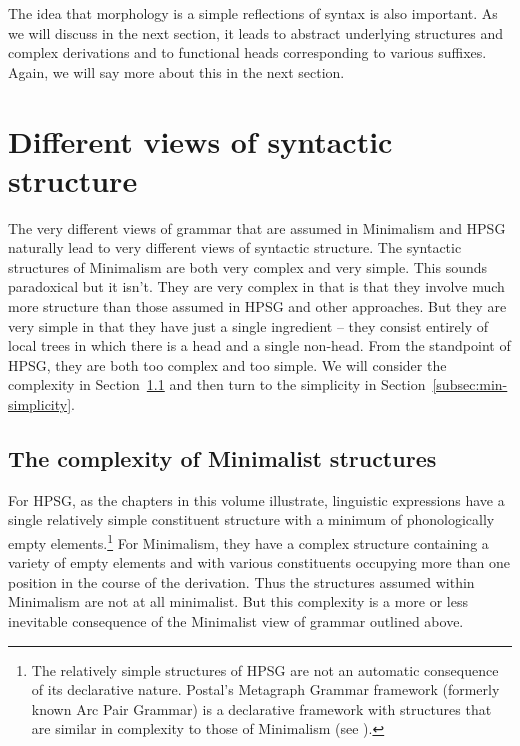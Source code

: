 \documentclass[output=paper]{langsci/langscibook}
\begin{document}
The idea that morphology is a simple reflections of syntax is also important. As we will discuss in the next section, it leads to abstract underlying structures and complex derivations and to functional heads corresponding to various suffixes. Again, we will say more about this in the next section. 
	
\section{Different views of syntactic structure}
\label{sec:min-views-structure}
The very different views of grammar that are assumed in Minimalism and HPSG naturally lead to very different views of syntactic structure. The syntactic structures of Minimalism are both very complex and very simple. This sounds paradoxical but it isn't. They are very complex in that is that they involve much more structure than those assumed in HPSG and other approaches. But they are very simple in that they have just a single ingredient -- they consist entirely of local trees in which there is a head and a single non-head. From the standpoint of HPSG, they are both too complex and too simple. We will consider the complexity in Section~\ref{subsec:min-complexity} and then turn to the simplicity in Section~\ref{subsec:min-simplicity}.

\subsection{The complexity of Minimalist structures}
\label{subsec:min-complexity}
For HPSG, as the chapters in this volume illustrate, linguistic expressions have a single relatively simple constituent structure with a minimum of phonologically empty elements.\footnote{%
	The relatively simple structures of HPSG are not an automatic consequence of its declarative nature. Postal's Metagraph Grammar framework (formerly known Arc Pair Grammar) is a declarative framework with structures that are similar in complexity to those of Minimalism (see \citealt{Postal.2010}).%
}
For Minimalism, they have a complex structure containing a variety of empty elements and with various constituents occupying more than one position in the course of the derivation. Thus the structures assumed within Minimalism are not at all minimalist. But this complexity is a more or less inevitable consequence of the Minimalist view of grammar outlined above.
\end{document}
